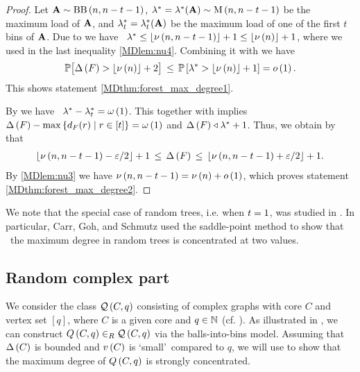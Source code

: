 \begin{proof}
Let $\mathbf{A}\sim \operatorname{BB}\left(n, n-t-1\right)$, $\lambda^\ast=\lambda^\ast(\mathbf{A})\sim \operatorname{M}\left(n, n-t-1\right)$ be the maximum load of $\mathbf{A}$, and $\lambda^\ast_{t}=\lambda^\ast_{t}(\mathbf{A})$ be the maximum load of one of the first $t$ bins of $\mathbf{A}$. Due to  we have \whp\ $\lambda^\ast\leq \left\lfloor\nu\left(n, n-t-1\right)\right\rfloor+1\leq\left\lfloor\nu\left(n\right)\right\rfloor+1$, where we used in the last inequality \ref{MDlem:nu4}. Combining it with  we have 
\begin{align*}
\mathbb{P}\big[\Delta\left(F\right)> \left\lfloor\nu\left(n\right)\right\rfloor+2\big]\hspace{0.06cm}\leq\hspace{0.06cm} \mathbb{P}\left[\lambda^\ast >\left\lfloor\nu\left(n\right)\right\rfloor+1\right]=o\left(1\right).
\end{align*}
This shows statement \ref{MDthm:forest_max_degree1}.

By  we have \whp\ $\lambda^\ast-\lambda^\ast_{t}=\omega\left(1\right)$. This together with  implies \whp\ $\Delta\left(F\right)-\max\left\{d_F(r) \mid r \in [t]\right\}=\omega\left(1\right)$ and $\Delta\left(F\right) \triangleleft \lambda^\ast+1$. Thus, we obtain by  that \whp
\begin{align*}
	\left\lfloor\nu\left(n, n-t-1\right)-\varepsilon/2\right\rfloor+1\hspace{0.06cm}\leq\hspace{0.06cm} \Delta\left(F\right)\hspace{0.06cm}\leq\hspace{0.06cm} \left\lfloor\nu\left(n, n-t-1\right)+\varepsilon/2\right\rfloor+1.
\end{align*}
By \ref{MDlem:nu3} we have $\nu\left(n, n-t-1\right)=\nu\left(n\right)+o\left(1\right)$, which proves statement \ref{MDthm:forest_max_degree2}.
\end{proof}

We note that the special case of random trees, i.e. when $t=1$, was studied in \cite{Moon1968,CarrGohSchmutz1994}. In particular, Carr, Goh, and Schmutz \cite{CarrGohSchmutz1994} used the saddle-point method to show that \whp\ the maximum degree in random trees is concentrated at two values.

\subsection{Random complex part}\label{MDsub:random_complex_part}
We consider the class $\mathcal{Q}\left(C,q\right)$ consisting of complex graphs with core $C$ and vertex set $[q]$, where $C$ is a given core and $q\in \mathbb{N}$ (cf. ). As illustrated in , we can construct $Q\left(C,q\right)\in_R \mathcal{Q}\left(C,q\right)$ via the balls-into-bins model. Assuming that $\Delta\left(C\right)$ is bounded and $v\left({C}\right)$ is \lq small\rq\ compared to $q$, we will use  to show that the maximum degree of $Q\left(C,q\right)$ is strongly concentrated.

